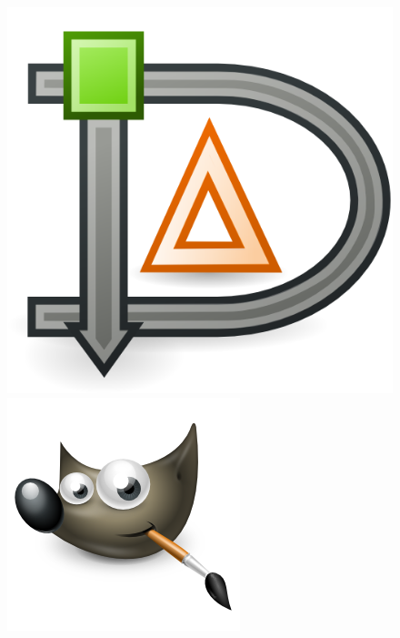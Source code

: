 \documentclass[spanish,xcolor=table,svgnames]{beamer}
\begin{document}
{\begin{figure}[]
\includegraphics[scale=1.2]{dia}\hspace{15mm}
\hspace{15mm}
\includegraphics[scale=0.25]{gimp}\\

\end{figure}}
\end{document}
